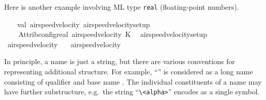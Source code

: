 \begin{isabellebody}
\endisatagML
{\isafoldML}%
%
\isadelimML
\isanewline
%
\endisadelimML
{}\isamarkupfalse%
%
\begin{isamarkuptext}%
Here is another example involving ML type \verb|real|
  (floating-point numbers).%
\end{isamarkuptext}%
\isamarkuptrue%
%
\isadelimML
%
\endisadelimML
%
\isatagML
{}\isamarkupfalse%
\ {}\isanewline
\ \ val\ {}airspeed{}velocity{}\ airspeed{}velocity{}setup{}\ {}\isanewline
\ \ \ \ Attrib{}config{}real\ {}airspeed{}velocity{}\ {}K\ {}{}{}{}\isanewline
{}\isanewline
{}\isamarkupfalse%
\ airspeed{}velocity{}setup%
\endisatagML
{\isafoldML}%
%
\isadelimML
%
\endisadelimML
\isanewline
\isanewline
{}\isamarkupfalse%
\ {}{}airspeed{}velocity\ {}\ {}{}{}{}\isanewline
{}\isamarkupfalse%
\ {}{}airspeed{}velocity\ {}\ {}{}{}{}{}%
\isamarkuptrue%
%
\begin{isamarkuptext}%
In principle, a name is just a string, but there are various
  conventions for representing additional structure.  For example,
  ``'' is considered as a long name consisting of
  qualifier  and base name .  The
  individual constituents of a name may have further substructure,
  e.g.\ the string ``\verb,\,\verb,<alpha>,'' encodes as a single
  symbol.


\end{isamarkuptext}
\end{isabellebody}

